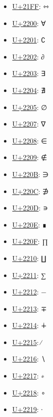 \begin{itemize}
	\item \href{https://www.compart.com/en/unicode/U+21FF}{U+21FF}: ⇿
	\item \href{https://www.compart.com/en/unicode/U+2200}{U+2200}: ∀
	\item \href{https://www.compart.com/en/unicode/U+2201}{U+2201}: ∁
	\item \href{https://www.compart.com/en/unicode/U+2202}{U+2202}: ∂
	\item \href{https://www.compart.com/en/unicode/U+2203}{U+2203}: ∃
	\item \href{https://www.compart.com/en/unicode/U+2204}{U+2204}: ∄
	\item \href{https://www.compart.com/en/unicode/U+2205}{U+2205}: ∅
	\item \href{https://www.compart.com/en/unicode/U+2207}{U+2207}: ∇
	\item \href{https://www.compart.com/en/unicode/U+2208}{U+2208}: ∈
	\item \href{https://www.compart.com/en/unicode/U+2209}{U+2209}: ∉
	\item \href{https://www.compart.com/en/unicode/U+220B}{U+220B}: ∋
	\item \href{https://www.compart.com/en/unicode/U+220C}{U+220C}: ∌
	\item \href{https://www.compart.com/en/unicode/U+220D}{U+220D}: ∍
	\item \href{https://www.compart.com/en/unicode/U+220E}{U+220E}: ∎
	\item \href{https://www.compart.com/en/unicode/U+220F}{U+220F}: ∏
	\item \href{https://www.compart.com/en/unicode/U+2210}{U+2210}: ∐
	\item \href{https://www.compart.com/en/unicode/U+2211}{U+2211}: ∑
	\item \href{https://www.compart.com/en/unicode/U+2212}{U+2212}: −
	\item \href{https://www.compart.com/en/unicode/U+2213}{U+2213}: ∓
	\item \href{https://www.compart.com/en/unicode/U+2214}{U+2214}: ∔
	\item \href{https://www.compart.com/en/unicode/U+2215}{U+2215}: ∕
	\item \href{https://www.compart.com/en/unicode/U+2216}{U+2216}: ∖
	\item \href{https://www.compart.com/en/unicode/U+2217}{U+2217}: ∗
	\item \href{https://www.compart.com/en/unicode/U+2218}{U+2218}: ∘
	\item \href{https://www.compart.com/en/unicode/U+2219}{U+2219}: ∙

\end{itemize}
